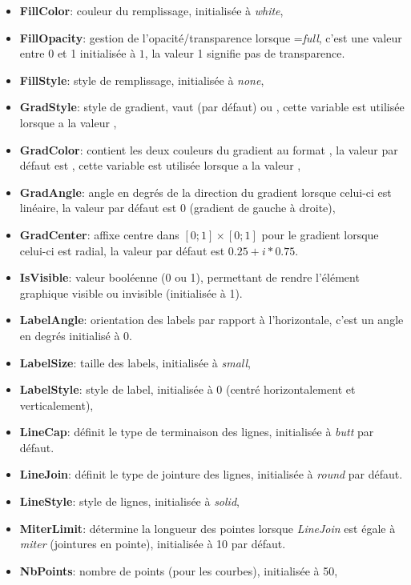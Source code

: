 \begin{itemize}
     \item \textbf{FillColor}: couleur du remplissage, initialisée à \textit{white},
     \item \textbf{FillOpacity}: gestion de l'opacité/transparence lorsque =\textsl{full}, c'est une valeur entre 0 et 1 initialisée à $1$, la valeur 1 signifie pas de transparence.
     \item \textbf{FillStyle}: style de remplissage, initialisée à \textit{none},      
     \item \textbf{GradStyle}: style de gradient, vaut  (par défaut) ou , cette variable est utilisée lorsque  a la valeur ,
     \item \textbf{GradColor}: contient les deux couleurs du gradient au format , la valeur par défaut est , cette variable est utilisée lorsque  a la valeur ,
    \item \textbf{GradAngle}: angle en degrés de la direction du gradient lorsque celui-ci est linéaire, la valeur par défaut est $0$ (gradient de gauche à droite),
    \item \textbf{GradCenter}: affixe centre dans $[0;1]\times[0;1]$ pour le gradient lorsque celui-ci est radial, la valeur par défaut est $0.25+i*0.75$.
        
    \item \textbf{IsVisible}: valeur booléenne (0 ou 1), permettant de rendre l'élément graphique visible ou invisible (initialisée à 1).

    \item \textbf{LabelAngle}: orientation des labels par rapport à l'horizontale, c'est un angle en degrés initialisé à 0.
     \item \textbf{LabelSize}: taille des labels, initialisée à \textit{small},
     \item \textbf{LabelStyle}: style de label, initialisée à 0 (centré horizontalement et verticalement),
     \item \textbf{LineCap}: définit le type de terminaison des lignes, initialisée à \textit{butt} par défaut.
     \item \textbf{LineJoin}: définit le type de jointure des lignes, initialisée à \textit{round} par défaut.
     \item \textbf{LineStyle}: style de lignes, initialisée à \textit{solid},
     \item \textbf{MiterLimit}: détermine la longueur des pointes lorsque \textit{LineJoin} est égale à \textit{miter} (jointures en pointe), initialisée à 10 par défaut.
     \item \textbf{NbPoints}: nombre de points (pour les courbes), initialisée à 50,
     

\end{itemize}
